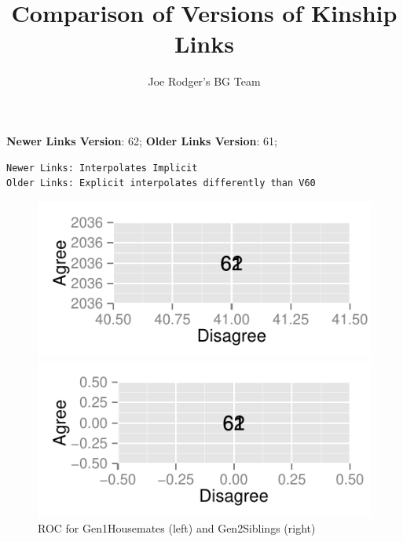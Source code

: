 \documentclass[a4paper]{article}\usepackage{graphicx, color}
\title{Comparison of Versions of Kinship Links}
\author{Joe Rodger's BG Team}
\makeatletter
\def\maxwidth{ %
  \ifdim\Gin@nat@width>\linewidth
    \linewidth
  \else
    \Gin@nat@width
  \fi
}
\newenvironment{kframe}{%
 \def\at@end@of@kframe{}%
 \ifinner\ifhmode%
  \def\at@end@of@kframe{\end{minipage}}%
  \begin{minipage}{\columnwidth}%
 \fi\fi%
 \def\FrameCommand##1{\hskip\@totalleftmargin \hskip-\fboxsep
 \colorbox{shadecolor}{##1}\hskip-\fboxsep
     \hskip-\linewidth \hskip-\@totalleftmargin \hskip\columnwidth}%
 \MakeFramed {\advance\hsize-\width
   \@totalleftmargin\z@ \linewidth\hsize
   \@setminipage}}%
 {\par\unskip\endMakeFramed%
 \at@end@of@kframe}
\newenvironment{knitrout}{}{} %
\makeatother
\begin{document}
\maketitle

\setlength{\parindent}{0pt}%







\textbf{Newer Links Version}: 62;
\textbf{Older Links Version}: 61;

\begin{knitrout}
\color{fgcolor}\begin{kframe}
\begin{verbatim}
Newer Links: Interpolates Implicit
Older Links: Explicit interpolates differently than V60
\end{verbatim}
\end{kframe}
\end{knitrout}


\begin{figure}[htbp]
\begin{knitrout}
\color{fgcolor}
\includegraphics[width=\maxwidth]{figure/unnamed-chunk-31} 

\includegraphics[width=\maxwidth]{figure/unnamed-chunk-32} 

\end{knitrout}

\caption{ROC for Gen1Housemates (left) and Gen2Siblings (right)}
\end{figure}
\end{document}
